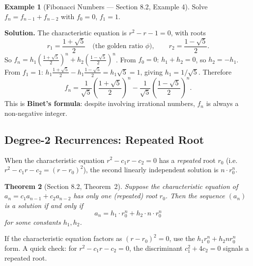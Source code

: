 \documentclass[11pt, a4paper, notitlepage]{report}
\newtheorem{theorem}{Theorem}[section]
\theoremstyle{definition}
\newtheorem{example}[theorem]{Example}
\theoremstyle{remark}
\begin{document}
\begin{example}[Fibonacci Numbers --- Section 8.2, Example 4]
\label{ex:fibonacci-closed}
Solve $f_n = f_{n-1} + f_{n-2}$ with $f_0 = 0$, $f_1 = 1$.

\textbf{Solution.}  The characteristic equation is $r^2 - r - 1 = 0$, with roots
\[
  r_1 = \frac{1+\sqrt{5}}{2} \quad\text{(the golden ratio } \phi\text{)}, \qquad
  r_2 = \frac{1-\sqrt{5}}{2}.
\]
So $f_n = h_1 \left(\tfrac{1+\sqrt{5}}{2}\right)^n + h_2 \left(\tfrac{1-\sqrt{5}}{2}\right)^n$.
From $f_0 = 0$: $h_1 + h_2 = 0$, so $h_2 = -h_1$.
From $f_1 = 1$: $h_1 \tfrac{1+\sqrt{5}}{2} - h_1 \tfrac{1-\sqrt{5}}{2} = h_1 \sqrt{5} = 1$,
giving $h_1 = 1/\sqrt{5}$.  Therefore
\[
  \boxed{f_n = \frac{1}{\sqrt{5}}\left(\frac{1+\sqrt{5}}{2}\right)^n
              - \frac{1}{\sqrt{5}}\left(\frac{1-\sqrt{5}}{2}\right)^n.}
\]
This is \textbf{Binet's formula}: despite involving irrational numbers, $f_n$ is always a
non-negative integer.
\end{example}

\subsection{Degree-2 Recurrences: Repeated Root}
\label{subsec:deg2-repeated}

When the characteristic equation $r^2 - c_1 r - c_2 = 0$ has a \emph{repeated} root
$r_0$ (i.e.\ $r^2 - c_1 r - c_2 = (r - r_0)^2$), the second linearly independent solution
is $n \cdot r_0^n$.

\begin{theorem}[Section 8.2, Theorem~2]
\label{thm:deg2-repeated}
Suppose the characteristic equation of $a_n = c_1 a_{n-1} + c_2 a_{n-2}$ has only one
(repeated) root $r_0$.  Then the sequence $(a_n)$ is a solution if and only if
\[
  a_n = h_1 \cdot r_0^n + h_2 \cdot n \cdot r_0^n
\]
for some constants $h_1, h_2$.
\end{theorem}

\begin{examtip}[title={Recognising a Repeated Root}]
If the characteristic equation factors as $(r - r_0)^2 = 0$, use the
$h_1 r_0^n + h_2 n r_0^n$ form.  A quick check: for $r^2 - c_1 r - c_2 = 0$, the discriminant
$c_1^2 + 4c_2 = 0$ signals a repeated root.
\end{examtip}
\end{document}
